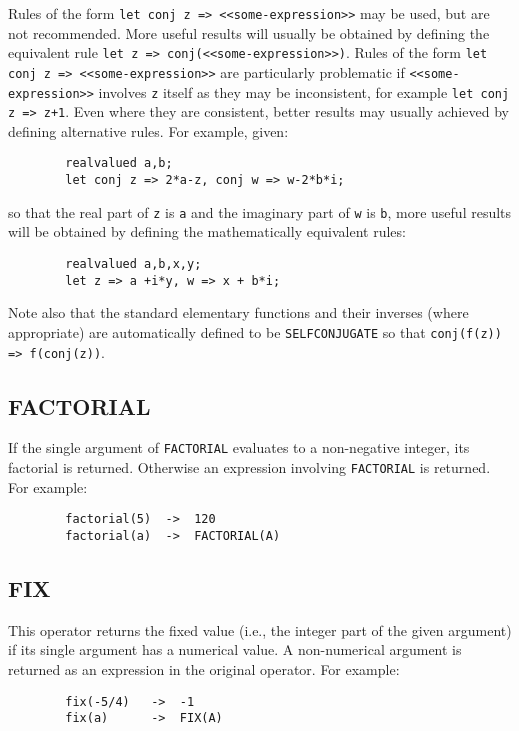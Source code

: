 Rules of the form \texttt{let conj z => <<some-expression>>} may be used,
but are not recommended. More useful results will usually be obtained by
defining the equivalent rule \texttt{let z => conj(<<some-expression>>)}.
Rules of the form \texttt{let conj z => <<some-expression>>} are particularly
problematic if \texttt{<<some-expression>>} involves \texttt{z} itself as
they may be inconsistent, for example \texttt{let conj z => z+1}. Even where
they are consistent, better results may usually achieved by defining alternative rules.
For example, given:
\begin{verbatim}
        realvalued a,b;
        let conj z => 2*a-z, conj w => w-2*b*i;
\end{verbatim}
so that the real part of \texttt{z} is \texttt{a} and the imaginary part
of \texttt{w} is \texttt{b}, more useful results will be obtained by
defining the mathematically equivalent rules:
\begin{verbatim}
        realvalued a,b,x,y;
        let z => a +i*y, w => x + b*i;
\end{verbatim}

Note also that the standard elementary functions and their inverses
(where appropriate) are automatically defined to be
  \texttt{SELFCONJUGATE} so that
 \texttt{conj(f(z)) => f(conj(z))}.

\subsection{FACTORIAL}
\hypertarget{operator:FACTORIAL}{}

If the single argument of \texttt{FACTORIAL} evaluates to a non-negative
integer, its factorial is returned.  Otherwise an expression involving
\texttt{FACTORIAL} is returned. For example:
\begin{verbatim}
        factorial(5)  ->  120
        factorial(a)  ->  FACTORIAL(A)
\end{verbatim}

\subsection{FIX}
\hypertarget{operator:FIX}{}
This operator returns the fixed value (i.e., the integer part of
the given argument) if its single argument has a numerical value.  A
non-numerical argument is returned as an expression in the original
operator.  For example:

\begin{verbatim}
        fix(-5/4)   ->  -1
        fix(a)      ->  FIX(A)
\end{verbatim}

